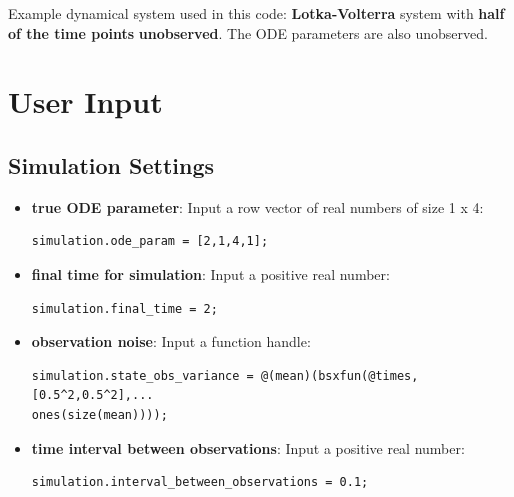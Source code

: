 Example dynamical system used in this code: \textbf{Lotka-Volterra} system with \textbf{half of the time points} \textbf{unobserved}. The ODE parameters are also unobserved.


\section{User Input}
\subsection{Simulation Settings}
\vspace{1em}
\begin{itemize}
   \item \textbf{true ODE parameter}: Input a row vector of real numbers of size 1 x 4:
    \color{RoyalPurple}\begin{verbatim}
simulation.ode_param = [2,1,4,1];
\end{verbatim}
\color{black}

   \item \textbf{final time for simulation}: Input a positive real number:
    \color{RoyalPurple}\begin{verbatim}
simulation.final_time = 2;
\end{verbatim}
\color{black}

   \item \textbf{observation noise}: Input a function handle:
    \color{RoyalPurple}\begin{verbatim}
simulation.state_obs_variance = @(mean)(bsxfun(@times,[0.5^2,0.5^2],...
ones(size(mean))));
\end{verbatim}
\color{black}

   \item \textbf{time interval between observations}: Input a positive real number:
    \color{RoyalPurple}\begin{verbatim}
simulation.interval_between_observations = 0.1;
\end{verbatim}
\color{black}
\end{itemize}

\vspace{1em}


